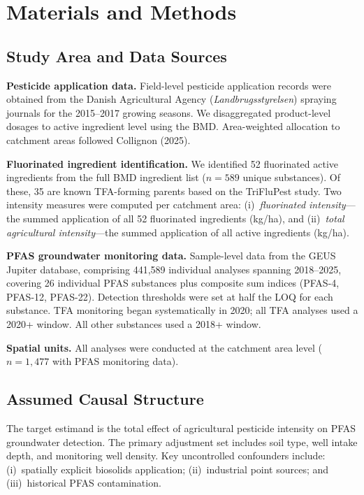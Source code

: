\documentclass[12pt,a4paper]{article}
\begin{document}
\section{Materials and Methods}

\subsection{Study Area and Data Sources}

\textbf{Pesticide application data.} Field-level pesticide application records were obtained from the Danish Agricultural Agency (\textit{Landbrugsstyrelsen}) spraying journals for the 2015--2017 growing seasons. We disaggregated product-level dosages to active ingredient level using the BMD. Area-weighted allocation to catchment areas followed Collignon (2025).

\textbf{Fluorinated ingredient identification.} We identified 52 fluorinated active ingredients from the full BMD ingredient list ($n = 589$ unique substances). Of these, 35 are known TFA-forming parents based on the TriFluPest study. Two intensity measures were computed per catchment area: (i)~\textit{fluorinated intensity}---the summed application of all 52 fluorinated ingredients (kg/ha), and (ii)~\textit{total agricultural intensity}---the summed application of all active ingredients (kg/ha).

\textbf{PFAS groundwater monitoring data.} Sample-level data from the GEUS Jupiter database, comprising 441,589 individual analyses spanning 2018--2025, covering 26 individual PFAS substances plus composite sum indices (PFAS-4, PFAS-12, PFAS-22). Detection thresholds were set at half the LOQ for each substance. TFA monitoring began systematically in 2020; all TFA analyses used a 2020+ window. All other substances used a 2018+ window.

\textbf{Spatial units.} All analyses were conducted at the catchment area level ($n = 1{,}477$ with PFAS monitoring data).

\subsection{Assumed Causal Structure}

The target estimand is the total effect of agricultural pesticide intensity on PFAS groundwater detection. The primary adjustment set includes soil type, well intake depth, and monitoring well density. Key uncontrolled confounders include: (i)~spatially explicit biosolids application; (ii)~industrial point sources; and (iii)~historical PFAS contamination.
\end{document}

